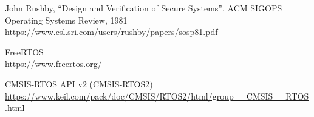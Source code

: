 \documentclass[11pt,letterpaper,twoside,openany]{book}
\begin{document}
\begin{thebibliography}{9}
John Rushby, ``Design and Verification of Secure Systems'', ACM SIGOPS Operating Systems Review, 1981 \\
\url{https://www.csl.sri.com/users/rushby/papers/sosp81.pdf}

FreeRTOS \\
\url{https://www.freertos.org/}

CMSIS-RTOS API v2 (CMSIS-RTOS2) \\
\url{https://www.keil.com/pack/doc/CMSIS/RTOS2/html/group__CMSIS__RTOS.html}

\end{thebibliography}
\end{document}
